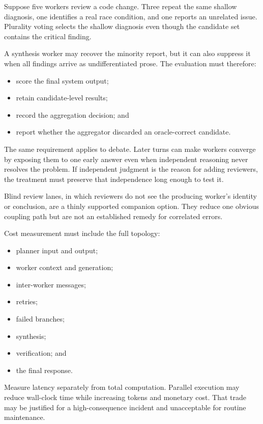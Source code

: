 Suppose five workers review a code change. Three repeat the same shallow diagnosis, one identifies a real race condition, and one reports an unrelated issue. Plurality voting selects the shallow diagnosis even though the candidate set contains the critical finding.


A synthesis worker may recover the minority report, but it can also suppress it when all findings arrive as undifferentiated prose. The evaluation must therefore:

\begin{itemize}
\tightlist
\item
  score the final system output;
\item
  retain candidate-level results;
\item
  record the aggregation decision; and
\item
  report whether the aggregator discarded an oracle-correct candidate.
\end{itemize}

The same requirement applies to debate. Later turns can make workers converge by exposing them to one early answer even when independent reasoning never resolves the problem. If independent judgment is the reason for adding reviewers, the treatment must preserve that independence long enough to test it.

Blind review lanes, in which reviewers do not see the producing worker's identity or conclusion, are a thinly supported companion option. They reduce one obvious coupling path but are not an established remedy for correlated errors.


Cost measurement must include the full topology:

\begin{itemize}
\tightlist
\item
  planner input and output;
\item
  worker context and generation;
\item
  inter-worker messages;
\item
  retries;
\item
  failed branches;
\item
  synthesis;
\item
  verification; and
\item
  the final response.
\end{itemize}

Measure latency separately from total computation. Parallel execution may reduce wall-clock time while increasing tokens and monetary cost. That trade may be justified for a high-consequence incident and unacceptable for routine maintenance.

